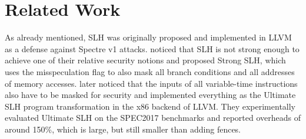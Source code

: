\section{Related Work}
\label{sec:related-work}


As already mentioned, SLH was originally proposed and implemented in
LLVM~\cite{Carruth18} as a defense against Spectre v1 attacks.
%
\citet{PatrignaniG21} noticed that SLH is not strong enough to achieve one of
their relative security notions and proposed Strong SLH, which uses the
misspeculation flag to also mask all branch conditions and all addresses of
memory accesses.
%
\citet{ZhangBCSY23} later noticed that the inputs of all variable-time
instructions also have to be masked for security and implemented everything as
the Ultimate SLH program transformation in the x86 backend of LLVM.
%
They experimentally evaluated Ultimate SLH on the SPEC2017 benchmarks and
reported overheads of around 150\%, which is large, but still smaller than
adding fences.


